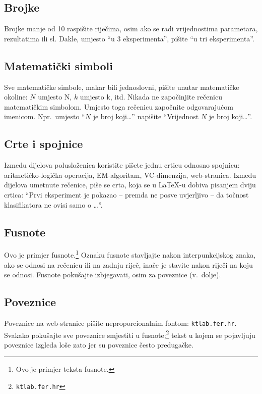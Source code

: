 \documentclass[10pt, a4paper]{article}
\begin{document}
\subsection{Brojke}

Brojke manje od 10 raspišite riječima, osim ako se radi vrijednostima
parametara, rezultatima ili sl. Dakle, umjesto ``u 3 eksperimenta'',
pišite ``u tri eksperimenta''.

\subsection{Matematički simboli}

Sve matematičke simbole, makar bili jednoslovni, pišite unutar
matematičke okoline: $N$ umjesto N, $k$ umjesto k, itd. Nikada ne
započinjite rečenicu matematičkim simbolom. Umjesto toga rečenicu
započnite odgovarajućom imenicom.  Npr.~umjesto ``$N$ je broj
koji\dots'' napišite ``Vrijednost $N$ je broj koji\dots''.

\subsection{Crte i spojnice}

Između dijelova polusloženica koristite pišete jednu crticu odnosno
spojnicu: aritmetičko-logička operacija, EM-algoritam, VC-dimenzija,
web-stranica.  Između dijelova umetnute rečenice, piše se crta, koja
se u \LaTeX-u dobiva pisanjem dviju crtica: ``Prvi eksperiment je
pokazao -- premda ne posve uvjerljivo -- da točnost klasifikatora ne
ovisi samo o \dots''.

\subsection{Fusnote}

Ovo je primjer fusnote.\footnote{Ovo je primjer teksta fusnote.}
Oznaku fusnote stavljajte nakon interpunkcijskog znaka, ako se odnosi
na rečenicu ili na zadnju riječ, inače je stavite nakon riječi na koju
se odnosi. Fusnote pokušajte izbjegavati, osim za poveznice
(v.~dolje).

\subsection{Poveznice}

Poveznice na web-stranice pišite neproporcionalnim fontom:
\texttt{ktlab.fer.hr}. Svakako pokušajte sve poveznice smjestiti u
fusnote;\footnote{\texttt{ktlab.fer.hr}} tekst u kojem se pojavljuju
poveznice izgleda loše zato jer su poveznice često predugačke.
\end{document}
